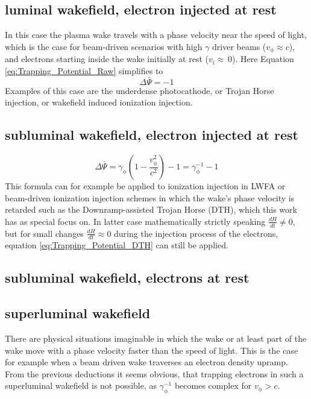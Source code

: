 \subsection{luminal wakefield, electron injected  at rest}
In this case the plasma wake travels with a phase velocity near the speed of light, which is the case for beam-driven scenarios with high $\gamma$ driver beams ($v_\mathrm{\phi} \approx c$), and electrons starting inside the wake initially at rest ($v_\mathrm{i} \approx \ 0$).
Here Equation \ref{eq:Trapping_Potential_Raw} simplifies to
\begin{equation}
\Delta \bar{\Psi}=-1
\end{equation}
Examples of this case are the underdense photocathode, or Trojan Horse injection\cite{Hidding_PRL_2012}, or wakefield induced ionization injection\cite{MartinezdelaOssa2014231}.
\subsection{subluminal wakefield, electron injected at rest}

\begin{equation}
\label{eq:Trapping_Potential_DTH}
\Delta \bar{\Psi}=\gamma_\mathrm{\phi}(1-\frac{v_\mathrm{\phi}^2}{c^2})-1=\gamma_\mathrm{\phi}^{-1}-1
\end{equation}
This formula can for example be applied to ionization injection in LWFA\cite{PakPRL2012} or beam-driven ionization injection schemes in which the wake's phase velocity is retarded such as the Downramp-assisted Trojan Horse (DTH)\cite{DTH}, which this work has as special focus on. In latter case mathematically strictly speaking $\frac{d H}{dt}\neq0 $, but for small changes $\frac{dH}{dt}\approx 0$ during the injection process of the electrons, equation \ref{eq:Trapping_Potential_DTH} can still be applied.
\subsection{subluminal wakefield, electrons at rest}

\subsection{superluminal wakefield}
There are physical situations imaginable in which the wake or at least part of the wake move with a phase velocity faster than the speed of light. This is the case for example when a beam driven wake traverses an electron density upramp.
From the previous deductions it seems obvious, that trapping electrons in such a superluminal wakefield is not possible, as $\gamma_\mathrm{\phi}^{-1}$ becomes complex for $v_\mathrm{\phi}>c$.

